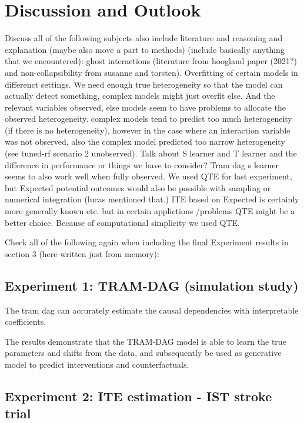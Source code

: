 

\chapter{Discussion and Outlook}


Discuss all of the following subjects also include literature and reasoning and explanation (maybe also move a part to methods) (include basically anything that we encountered): ghost interactions (literature from hoogland paper (2021?) and non-collapsibility from susanne and torsten). Overfitting of certain models in differenct settings. We need enough true heterogeneity so that the model can actually detect something, complex models might just overfit else. And the relevant variables observed, else models seem to have problems to allocate the observed heterogeneity. complex models tend to predict too much heterogeneity (if there is no heterogeneity), however in the case where an interaction variable was not observed, also the complex model predicted too narrow heterogeneity (see tuned-rf scenario 2 unobserved). Talk about S learner and T learner and the difference in performance or things we have to consider? Tram dag s learner seems to also work well when fully observed. We used QTE for last experiment, but Expected potential outcomes would also be possible with sampling or numerical integration (lucas mentioned that.) ITE based on Expected is certainly more generally known etc. but in certain applictions /problems QTE might be a better choice. Because of computational simplicity we used QTE.



Check all of the following again when including the final Experiment results in section 3 (here written just from memory):


\section{Experiment 1: TRAM-DAG (simulation study)}

The tram dag can accurately estimate the causal dependencies with interpretable coefficients.

The results demonstrate that the TRAM-DAG model is able to learn the true parameters and shifts from the data, and subsequently be used as generative model to predict interventions and counterfactuals.


\section{Experiment 2: ITE estimation - IST stroke trial}

